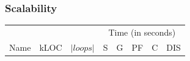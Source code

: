 \documentclass{beamer}
\begin{document}
\begin{frame}
	\frametitle{Scalability}

\begin{table}[!h]
	\centering
\begin{tabular}{|l|r|r||r|r|r|r|r|} \hline
	 	 & & &
        \multicolumn{5}{|c|}{Time (in seconds)} 
		\\ \cline{4-8}
		Name & kLOC & $ |loops| $ & S & G & PF & C & DIS \\ \hline
		
	\hline
\end{tabular}
\label{fig:projects}
\end{table}

\end{frame}
\end{document}
